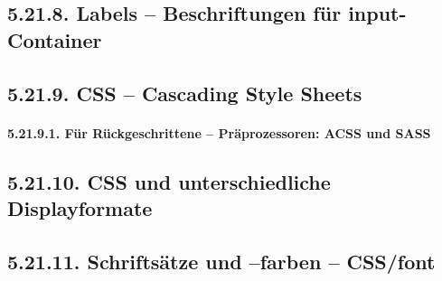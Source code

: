 \subsection{5.21.8.	Labels – Beschriftungen für input-Container}
\subsection{5.21.9.	CSS – Cascading Style Sheets}
\paragraph{5.21.9.1.	Für Rückgeschrittene – Präprozessoren: ACSS und SASS}
\subsection{5.21.10.	CSS und unterschiedliche Displayformate}
\subsection{5.21.11.	Schriftsätze und –farben – CSS/font}
